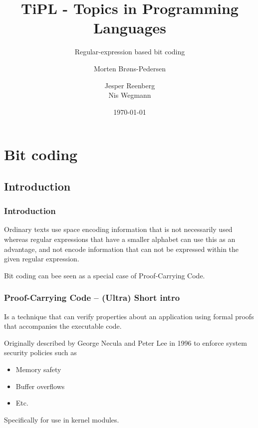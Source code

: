 \documentclass[slidestop,compress,mathserif, xcolor=table]{beamer}
\title[]{TiPL - Topics in Programming Languages}
\subtitle{Regular-expression based bit coding}
\author[Morten Brøns-Pedersen \and Jesper Reenberg \and Nis Wegmann]
       {Morten Brøns-Pedersen \and
        Jesper Reenberg  \\
        Nis Wegmann }
\institute[DIKU]{Department of Computer Science}
\date[]{\today}
\begin{document}
\frame[plain]{\titlepage}

\section{Bit coding}

\subsection{Introduction}

\begin{frame}
  \frametitle{Introduction}

  Ordinary texts use space encoding information that is not necessarily used whereas
  regular expressions that have a smaller alphabet can use this as an advantage,
  and not encode information that can not be expressed within the given regular
  expression.
  
  Bit coding can bee seen as a special case of Proof-Carrying Code.
  
\end{frame}

\begin{frame}
  \frametitle{Proof-Carrying Code -- (Ultra) Short intro}
  
  \begin{definition}[Weak]
    Is a technique that can verify properties about an application using formal
    proofs that accompanies the executable code.
  \end{definition}

  Originally described by George Necula and Peter Lee in 1996\cite{nele1996} to
  enforce system security policies such as

  \begin{itemize}
  \item Memory safety
  \item Buffer overflows
  \item Etc.
  \end{itemize}

  Specifically for use in kernel modules.

\end{frame}
\end{document}
